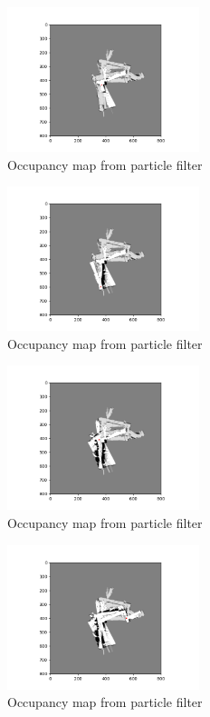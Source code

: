 \documentclass[a4paper]{article}
\begin{document}
\begin{figure}[h]
    \centering
    \includegraphics[width=0.5\textwidth]{map_800.png}
    \caption{Occupancy map from particle filter}
    \label{fig:particle_filter}
\end{figure}
\begin{figure}[h]
    \centering
    \includegraphics[width=0.5\textwidth]{map_1600.png}
    \caption{Occupancy map from particle filter}
    \label{fig:particle_filter}
\end{figure}
\begin{figure}[h]
    \centering
    \includegraphics[width=0.5\textwidth]{map_2400.png}
    \caption{Occupancy map from particle filter}
    \label{fig:particle_filter}
\end{figure}
\begin{figure}[h]
    \centering
    \includegraphics[width=0.5\textwidth]{map_3200.png}
    \caption{Occupancy map from particle filter}
    \label{fig:particle_filter}
\end{figure}
\end{document}
